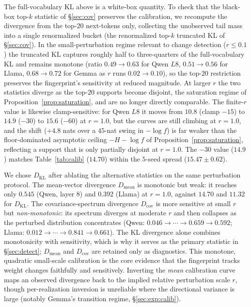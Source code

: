\documentclass[11pt]{article}
\theoremstyle{definition}
\begin{document}
The full-vocabulary KL above is a white-box quantity. To check that the
black-box top-$k$ statistic of \S\ref{sec:cov} preserves the calibration, we
recompute the divergence from the top-$20$ next-tokens only, collecting the
unobserved tail mass into a single renormalized bucket (the renormalized top-$k$
truncated KL of \S\ref{sec:cov}). In the small-perturbation regime relevant to change
detection ($r \le 0.1$) the truncated KL captures roughly half to three-quarters
of the full-vocabulary KL and remains monotone (ratio $0.49 \to 0.63$ for Qwen
$L8$, $0.51 \to 0.56$ for Llama, $0.68 \to 0.72$ for Gemma as $r$ runs $0.02 \to
0.10$), so the top-$20$ restriction preserves the fingerprint's sensitivity at
reduced magnitude. At larger $r$ the two statistics diverge as the top-$20$
supports become disjoint, the saturation regime of
Proposition~\ref{prop:saturation}, and are no longer directly comparable.
The finite-$r$ value is likewise clamp-sensitive: for Qwen $L8$ it moves from
$10.8$ (clamp $-15$) to $14.9$ ($-30$) to $15.6$ ($-60$) at $r = 1.0$, but the
curves are still climbing at $r = 1.0$, and the shift ($+4.8$ nats over a
$45$-nat swing in $-\log f$) is far weaker than the floor-dominated asymptotic
ceiling $-H - \log f$ of Proposition~\ref{prop:saturation}, reflecting a support
that is only partially disjoint at $r = 1.0$. The $-30$ value ($14.9$) matches
Table~\ref{tab:calib} ($14.70$) within the $5$-seed spread ($15.47 \pm 0.62$).

We chose $D_{\mathrm{KL}}$ after ablating the alternative statistics on the
same perturbation protocol. The mean-vector divergence $D_{\mathrm{mean}}$ is
monotonic but weak: it reaches only $0.545$ (Qwen, layer $8$) and $0.392$
(Llama) at $r = 1.0$, against $14.70$ and $11.32$ for $D_{\mathrm{KL}}$. The
covariance-spectrum divergence $D_{\mathrm{cov}}$ is more sensitive at small
$r$ but \emph{non-monotonic}: its spectrum diverges at moderate $r$ and then
collapses as the perturbed distribution concentrates (Qwen: $0.046 \to \cdots
\to 0.659 \to 0.592$; Llama: $0.012 \to \cdots \to 0.841 \to 0.661$). The KL
divergence alone combines monotonicity with sensitivity, which is why it serves
as the primary statistic in \S\ref{sec:detect}; $D_{\mathrm{mean}}$ and
$D_{\mathrm{cov}}$ are retained only as diagnostics. This monotone, quadratic
small-scale calibration is the core evidence that the fingerprint tracks weight
changes faithfully and sensitively. Inverting the \emph{mean} calibration curve
maps an observed
divergence back to the implied relative perturbation scale $r$, though
per-realization inversion is unreliable where the directional variance is large
(notably Gemma's transition regime, \S\ref{sec:exp:calib}).
\end{document}

